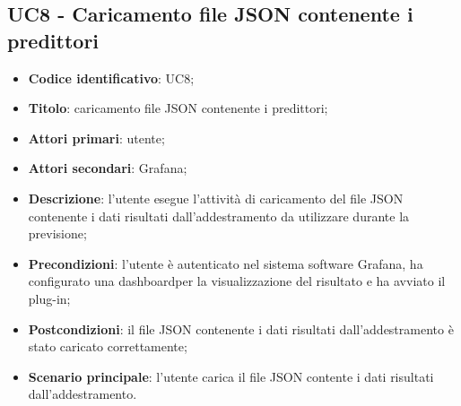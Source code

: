 \subsection{UC8 - Caricamento file JSON contenente i predittori}
\begin{itemize}
	\item \textbf{Codice identificativo}: UC8;
	\item \textbf{Titolo}: caricamento file JSON contenente i predittori;
	\item \textbf{Attori primari}: utente;
	\item \textbf{Attori secondari}: Grafana\glo;
	\item \textbf{Descrizione}: l'utente esegue l'attività di caricamento del file JSON contenente i dati risultati dall'addestramento da utilizzare durante la previsione;
	\item \textbf{Precondizioni}: l'utente è autenticato nel sistema software Grafana\glosp, ha configurato una dashboard\glosp per la visualizzazione del risultato e ha avviato il plug-in;
	\item \textbf{Postcondizioni}: il file JSON contenente i dati risultati dall'addestramento è stato caricato correttamente;
	\item \textbf{Scenario principale}: l'utente carica il file JSON contente i dati risultati dall'addestramento.
\end{itemize}